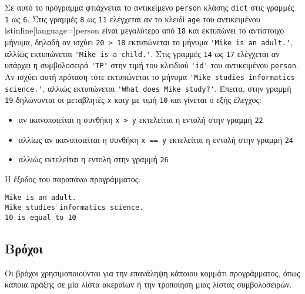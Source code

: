 \documentclass[14pt]{extreport}
\begin{document}


Σε αυτό το πρόγραμμα φτιάχνεται το αντικείμενο \lstinline{person} κλάσης \lstinline{dict} στις γραμμές \lstinline{1} ως \lstinline{6}. Στις γραμμές \lstinline{8} ως \lstinline{11} ελέγχεται αν το κλειδί \lstinline[language={}]{age} του αντικειμένου lstinline[language={}]{person} είναι μεγαλύτερο από \lstinline{18} και εκτυπώνει το αντίστοιχο μήνυμα, δηλαδή αν ισχύει \lstinline{20 > 18} εκτυπώνεται το μήνυμα \lstinline[language={}]{'Mike is an adult.'}, αλλίως εκτυπώνεται \lstinline[language={}]{'Mike is a child.'}. Στις γραμμές \lstinline{14} ως \lstinline{17} ελέγχεται αν υπάρχει η συμβολοσειρά \lstinline[language={}]{'TP'} στην τιμή του κλειδιού \lstinline[language={}]{'id'} του αντικειμένου \lstinline[language={}]{person}. Αν ισχύει αυτή πρόταση τότε εκτυπώνεται το μήνυμα \lstinline[language={}]{'Mike studies informatics science.'}, αλλιώς εκτυπώνεται \lstinline[language={}]{'What does Mike study?'}. Έπειτα, στην γραμμή \lstinline{19} δηλώνονται οι μεταβλητές \lstinline{x} και\lstinline{y} με τιμή \lstinline{10} και γίνεται ο εξής έλεγχος:
\begin{itemize}
    \itemsep0cm
    \item αν ικανοποιείται η συνθήκη \lstinline{x > y} εκτελείται η εντολή στην γραμμή \lstinline{22}
    \item αλλίως αν ικανοποιείται η συνθήκη \lstinline{x == y} εκτελείται η εντολή στην γραμμή \lstinline{24}
    \item αλλιώς εκτελείται η εντολή στην γραμμή \lstinline{26}
\end{itemize}

Η έξοδος του παραπάνω προγράμματος:

\begin{lstlisting}[language={}]
Mike is an adult.
Mike studies informatics science.
10 is equal to 10
\end{lstlisting}

\subsection{Βρόχοι}

Οι βρόχοι χρησιμοποιούνται για την επανάληψη κάποιου κομμάτι προγράμματος, όπως κάποια πράξης σε μία λίστα ακεραίων ή την τροποίηση μιας λίστας συμβολοσειρών.


\end{document}
